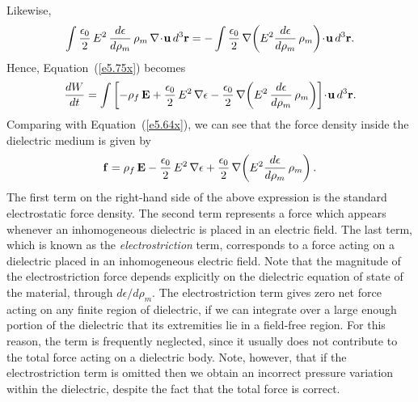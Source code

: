 Likewise,
\begin{equation}
\int\frac{\epsilon_0}{2}\,E^2\,\frac{d\epsilon}{d\rho_m} \,\rho_m\,\nabla\!\cdot\!{\bf u}\,d^3{\bf r} = - \int\frac{\epsilon_0}{2}\,
\nabla\!\left(E^2 \frac{d\epsilon}{d\rho_m}\,\rho_m\right)\!\cdot\!
{\bf u}\,d^3{\bf r}.
\end{equation}
Hence, Equation~(\ref{e5.75x}) becomes
\begin{equation}
\frac{dW}{dt} = \int\left[-\rho_f \,{\bf E} +\frac{\epsilon_0}{2}\,
E^2\,\nabla\epsilon - \frac{\epsilon_0}{2}\,
\nabla\!\left(E^2\,\frac{d\epsilon}{d\rho_m}\,\rho_m\right)
\right]\!\cdot\! {\bf u}\, d^3{\bf r}.
\end{equation}
Comparing with Equation~(\ref{e5.64x}), we can see that the  force density inside the
dielectric medium is
given by
\begin{equation}\label{e5.79x}
{\bf f} = \rho_f \,{\bf E} - \frac{\epsilon_0}{2} \,E^2\,\nabla\epsilon
+ \frac{\epsilon_0}{2} \,\nabla\!\left(E^2 \frac{d\epsilon}{d\rho_m}\,\rho_m
\right).
\end{equation}
The first term on the right-hand side of the above expression is the standard electrostatic
force density. The second term represents a force which appears whenever
an inhomogeneous dielectric is placed in an electric field. The last 
term, which is known as the {\em electrostriction}\/ term, corresponds to a force acting
on a dielectric placed in an inhomogeneous electric field. Note that the
magnitude of the electrostriction force depends explicitly on the
dielectric equation of state of the material, through $d\epsilon/d\rho_m$. 
The electrostriction  term gives zero net force acting on any finite region
of dielectric, if we can integrate over a large enough portion of the dielectric that its extremities lie in a field-free region. For this reason,
the term is frequently neglected, since  it usually does not contribute to the
total force acting on a dielectric body. 
Note, however, that if the electrostriction
 term is omitted then we obtain an incorrect pressure
variation within the dielectric, despite the fact that the total force is correct.

